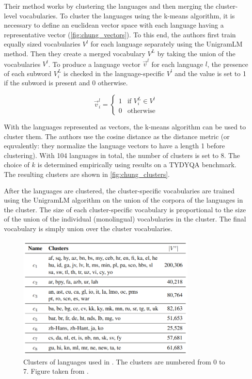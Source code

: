 Their method works by clustering the languages and then merging the cluster-level vocabularies. To cluster the languages using the k-means algorithm, it is necessary to define an euclidean vector space with each language having a representative vector (\autoref{fig:chung_vectors}). To this end, the authors first train equally sized vocabularies $V^l$ for each language separately using the UnigramLM method. Then they create a merged vocabulary $V^L$ by taking the union of the vocabularies $V^l$. To produce a language vector $\vec{v}^l$ for each language $l$, the presence of each subword $V^L_i$ is checked in the language-specific $V^l$ and the value is set to 1 if the subword is present and 0 otherwise.

\begin{equation}
    \vec{v}^l_i = \begin{cases}
        1 & \text{if } V^L_i \in V^l \\
        0 & \text{otherwise}
    \end{cases}
\end{equation}

With the languages represented as vectors, the k-means algorithm can be used to cluster them. The authors use the cosine distance as the distance metric (or equvalently: they normalize the language vectors to have a length 1 before clustering). With 104 languages in total, the number of clusters is set to 8. The choice of $k$ is determined empirically using results on a TYDYQA benchmark. The resulting clusters are shown in \autoref{fig:chung_clusters}.

After the languages are clustered, the cluster-specific vocabularies are trained using the UnigramLM algorithm on the union of the corpora of the languages in the cluster. The size of each cluster-specific vocabulary is proportional to the size of the union of the individual (monolingual) vocabularies in the cluster. The final vocabulary is simply union over the cluster vocabularies.


\begin{figure}[ht]
    \centering
    \includegraphics[width=0.8\textwidth]{img/temp/chung_clusters.png}
    \caption{Clusters of languages used in \cite{chung_improving_2020}. The clusters are numbered from 0 to 7. Figure taken from \cite{chung_improving_2020}.}
    \label{fig:chung_clusters}
\end{figure}


